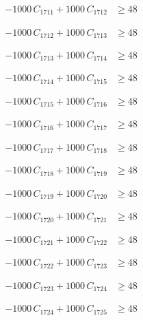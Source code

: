 \documentclass[a4paper,11pt]{article}
\begin{document}
\begin{align}
-1000\,C_{1711} + 1000\,C_{1712} &\geq 48 \nonumber
\end{align}

\begin{align}
-1000\,C_{1712} + 1000\,C_{1713} &\geq 48 \nonumber
\end{align}

\begin{align}
-1000\,C_{1713} + 1000\,C_{1714} &\geq 48 \nonumber
\end{align}

\begin{align}
-1000\,C_{1714} + 1000\,C_{1715} &\geq 48 \nonumber
\end{align}

\begin{align}
-1000\,C_{1715} + 1000\,C_{1716} &\geq 48 \nonumber
\end{align}

\begin{align}
-1000\,C_{1716} + 1000\,C_{1717} &\geq 48 \nonumber
\end{align}

\begin{align}
-1000\,C_{1717} + 1000\,C_{1718} &\geq 48 \nonumber
\end{align}

\begin{align}
-1000\,C_{1718} + 1000\,C_{1719} &\geq 48 \nonumber
\end{align}

\begin{align}
-1000\,C_{1719} + 1000\,C_{1720} &\geq 48 \nonumber
\end{align}

\begin{align}
-1000\,C_{1720} + 1000\,C_{1721} &\geq 48 \nonumber
\end{align}

\begin{align}
-1000\,C_{1721} + 1000\,C_{1722} &\geq 48 \nonumber
\end{align}

\begin{align}
-1000\,C_{1722} + 1000\,C_{1723} &\geq 48 \nonumber
\end{align}

\begin{align}
-1000\,C_{1723} + 1000\,C_{1724} &\geq 48 \nonumber
\end{align}

\begin{align}
-1000\,C_{1724} + 1000\,C_{1725} &\geq 48 \nonumber
\end{align}
\end{document}
